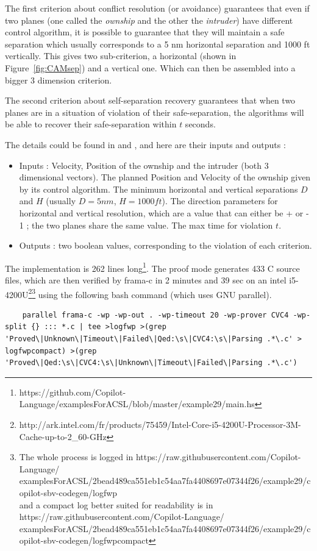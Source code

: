 \documentclass[a4paper,11pt,final]{article}
\begin{document}
	The first criterion about conflict resolution (or avoidance) guarantees that even if two planes (one called the \emph{ownship} and the other the \emph{intruder}) have different control algorithm, it is possible to guarantee that they will maintain a safe separation which usually corresponds to a 5 nm horizontal separation and 1000 ft vertically. This gives two sub-criterion, a horizontal (shown in Figure~\ref{fig:CAMsep}) and a vertical one. Which can then be assembled into a bigger 3 dimension criterion.
	
	The second criterion about self-separation recovery guarantees that when two planes are in a situation of violation of their safe-separation, the algorithms will be able to recover their safe-separation within $t$ seconds.
	
	The details could be found in \cite{MBNMH2010NASA} and \cite{NM2011NASA}, and here are their inputs and outputs :
	\begin{itemize}
		\item Inputs : Velocity, Position of the ownship and the intruder (both 3 dimensional vectors). The planned Position and Velocity of the ownship given by its control algorithm. The minimum horizontal and vertical separations $D$ and $H$ (usually $D = 5nm$, $H=1000ft$). The direction parameters for horizontal and vertical resolution, which are a value that can either be + or - 1 ; the two planes share the same value. The max time for violation $t$.
		\item Outputs : two boolean values, corresponding to the violation of each criterion.
	\end{itemize}
	
	The implementation is 262 lines long\footnote{https://github.com/Copilot-Language/examplesForACSL/blob/master/example29/main.hs}. The proof mode generates 433 C source files, which are then verified by frama-c in 2 minutes and 39 sec on an intel i5-4200U\footnote{http://ark.intel.com/fr/products/75459/Intel-Core-i5-4200U-Processor-3M-Cache-up-to-2\_60-GHz}\footnote{The whole process is logged in  https://raw.githubusercontent.com/Copilot-Language/\\examplesForACSL/2bead489ca551eb1c54aa7fa4408697e07344f26/example29/copilot-sbv-codegen/logfwp \\ and a compact log better suited for readability is in  https://raw.githubusercontent.com/Copilot-Language/\\examplesForACSL/2bead489ca551eb1c54aa7fa4408697e07344f26/example29/copilot-sbv-codegen/logfwpcompact} using the following bash command (which uses GNU parallel).
	\begin{lstlisting}
	parallel frama-c -wp -wp-out . -wp-timeout 20 -wp-prover CVC4 -wp-split {} ::: *.c | tee >logfwp >(grep 'Proved\|Unknown\|Timeout\|Failed\|Qed:\s\|CVC4:\s\|Parsing .*\.c' > logfwpcompact) >(grep 'Proved\|Qed:\s\|CVC4:\s\|Unknown\|Timeout\|Failed\|Parsing .*\.c')
	\end{lstlisting}
	
\end{document}

